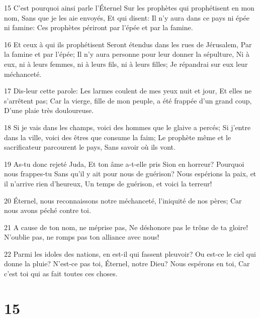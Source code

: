\par 15 C'est pourquoi ainsi parle l'Éternel Sur les prophètes qui prophétisent en mon nom, Sans que je les aie envoyés, Et qui disent: Il n'y aura dans ce pays ni épée ni famine: Ces prophètes périront par l'épée et par la famine.
\par 16 Et ceux à qui ils prophétisent Seront étendus dans les rues de Jérusalem, Par la famine et par l'épée; Il n'y aura personne pour leur donner la sépulture, Ni à eux, ni à leurs femmes, ni à leurs fils, ni à leurs filles; Je répandrai sur eux leur méchanceté.
\par 17 Dis-leur cette parole: Les larmes coulent de mes yeux nuit et jour, Et elles ne s'arrêtent pas; Car la vierge, fille de mon peuple, a été frappée d'un grand coup, D'une plaie très douloureuse.
\par 18 Si je vais dans les champs, voici des hommes que le glaive a percés; Si j'entre dans la ville, voici des êtres que consume la faim; Le prophète même et le sacrificateur parcourent le pays, Sans savoir où ils vont.
\par 19 As-tu donc rejeté Juda, Et ton âme a-t-elle pris Sion en horreur? Pourquoi nous frappes-tu Sans qu'il y ait pour nous de guérison? Nous espérions la paix, et il n'arrive rien d'heureux, Un temps de guérison, et voici la terreur!
\par 20 Éternel, nous reconnaissons notre méchanceté, l'iniquité de nos pères; Car nous avons péché contre toi.
\par 21 A cause de ton nom, ne méprise pas, Ne déshonore pas le trône de ta gloire! N'oublie pas, ne romps pas ton alliance avec nous!
\par 22 Parmi les idoles des nations, en est-il qui fassent pleuvoir? Ou est-ce le ciel qui donne la pluie? N'est-ce pas toi, Éternel, notre Dieu? Nous espérons en toi, Car c'est toi qui as fait toutes ces choses.

\chapter{15}

